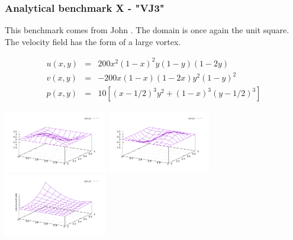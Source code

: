 \subsubsection{Analytical benchmark X \label{mms10} - "VJ3"}

This benchmark comes from John \etal \cite{jolm17}.
The domain is once again the unit square. The velocity field has the form of a large vortex.

\begin{eqnarray}
u(x,y) &=& 200x^2(1-x)^2y(1-y)(1-2y) \\
v(x,y) &=& -200x(1-x)(1-2x)y^2(1-y)^2 \\
p(x,y) &=& 10\left[(x-1/2)^3y^2+(1-x)^3(y-1/2)^3 \right]
\end{eqnarray}

\begin{center}
\includegraphics[width=4.5cm]{images/benchmark_VJ3/u.pdf}
\includegraphics[width=4.5cm]{images/benchmark_VJ3/v.pdf}
\includegraphics[width=4.5cm]{images/benchmark_VJ3/p.pdf}
\end{center}

